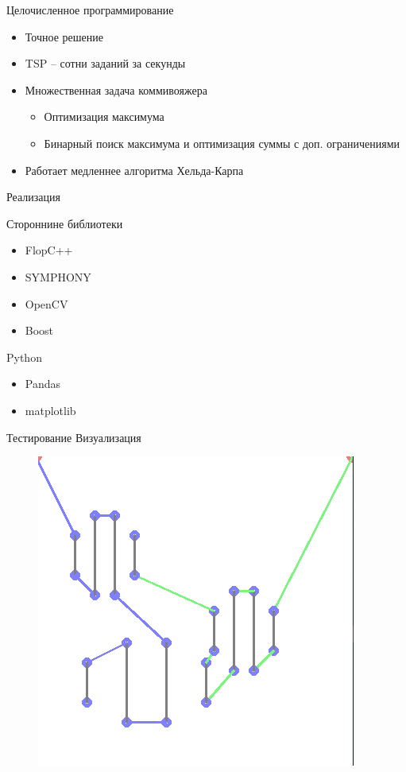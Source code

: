 \documentclass{beamer}
\begin{document}
\begin{frame}{Целочисленное программирование}
\begin{itemize}
\item Точное решение
\item TSP -- сотни заданий за секунды
\item Множественная задача коммивояжера
    \begin{itemize}
    \item Оптимизация максимума
    \item Бинарный поиск максимума и оптимизация суммы с доп. ограничениями
    \end{itemize}

\item Работает медленнее алгоритма Хельда-Карпа
\end{itemize}
\end{frame}

\begin{frame}{Реализация}


Стороннине библиотеки
\begin{itemize}
\item FlopC++
\item SYMPHONY
\item OpenCV
\item Boost
\end{itemize}

Python
\begin{itemize}
\item Pandas
\item matplotlib
\end{itemize}

\end{frame}

\begin{frame}{Тестирование}
Визуализация
\begin{figure}[here]
    \includegraphics[scale=0.5]{images/hk2.png}
\end{figure}

\end{frame}
\end{document}
